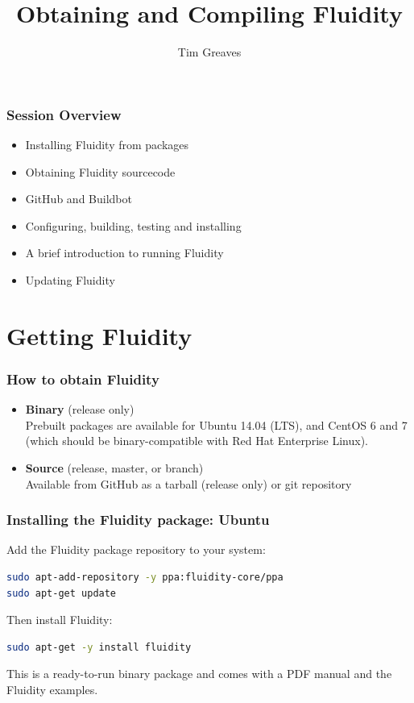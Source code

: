 \documentclass[12pt]{beamer}
\title[Fluidity]{Obtaining and Compiling Fluidity}
\subtitle[]{}
\institute{1 - Dept of Earth Science and Engineering, Imperial College London}
\author[Tim Greaves]{\large{Tim Greaves}\inst{1}}
\date{}
\begin{document}
\begin{frame}
  \titlepage
\end{frame}

\begin{frame}
  \frametitle{Session Overview}
\begin{itemize}
    \item Installing Fluidity from packages
    \item Obtaining Fluidity sourcecode
    \item GitHub and Buildbot
    \item Configuring, building, testing and installing
    \item A brief introduction to running Fluidity
    \item Updating Fluidity
\end{itemize}
\end{frame}


\section{Getting Fluidity}
\begin{frame}
        \frametitle{How to obtain Fluidity}
\begin{itemize}
    \item {\bf Binary} (release only)
	  \\Prebuilt packages are available for Ubuntu 14.04 (LTS),
              and CentOS 6 and 7 (which should be binary-compatible
              with Red Hat Enterprise Linux).
    \item {\bf Source} (release, master, or branch)
	  \\Available from GitHub as a tarball (release only) or git repository
\end{itemize}
\end{frame}

\begin{frame}[fragile]
        \frametitle{Installing the Fluidity package: Ubuntu}
\lstset{language=bash}
Add the Fluidity package repository to your system:
\begin{lstlisting}[language=bash,basicstyle=\ttfamily\scriptsize]
sudo apt-add-repository -y ppa:fluidity-core/ppa
sudo apt-get update
\end{lstlisting}
Then install Fluidity:
\begin{lstlisting}[language=bash,basicstyle=\ttfamily\scriptsize]
sudo apt-get -y install fluidity
\end{lstlisting}
This is a ready-to-run binary package and comes with a PDF manual and the
Fluidity examples.
\end{frame}
\end{document}
